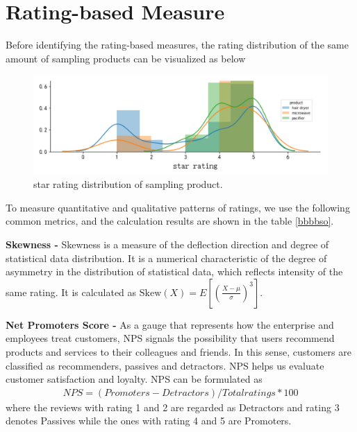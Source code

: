 \documentclass[12pt]{article}%
\begin{document}

\section{Rating-based Measure}
Before identifying the rating-based measures, the rating distribution of the same amount of sampling products can be visualized as below

\begin{figure}[H]
	\centering
	\includegraphics[width=1\textwidth]{score.png}%
	\caption{star rating distribution of sampling product.	}\label{scosssre}%
\end{figure}


To measure quantitative and qualitative patterns of ratings, we use the following common metrics, and the calculation results are shown in the table \ref{bbbbso}.

\textbf{Skewness -} Skewness is a measure of the deflection direction and degree of statistical data distribution. It is a numerical characteristic of the degree of asymmetry in the distribution of statistical data, which reflects intensity of the same rating. It is calculated as $\text {Skew}(X)=E\left[\left(\frac{X-\mu}{\sigma}\right)^{3}\right]$. 

\textbf{Net Promoters Score -} 
As a gauge that represents how the enterprise and employees treat customers, NPS signals the possibility that users recommend products and services to their colleagues and friends. In this sense, customers are classified as recommenders, passives and detractors. NPS helps us evaluate customer satisfaction and loyalty\cite{nsp}. NPS can be formulated as
\begin{gather}
NPS = (Promoters - Detractors)/Total ratings * 100
\end{gather}
where the reviews with rating 1 and 2 are regarded as Detractors and rating 3 denotes Passives while the ones with rating 4 and 5 are Promoters.
\end{document}
